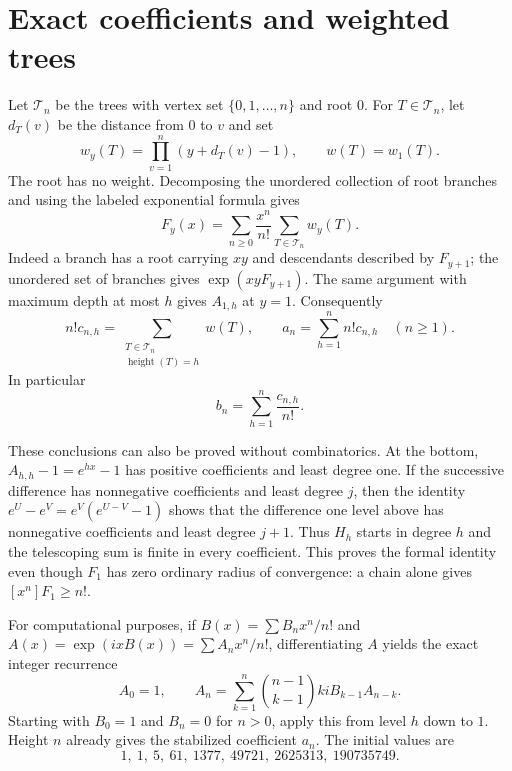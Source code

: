 \documentclass[11pt]{article}
\theoremstyle{remark}\newtheorem{remark}[theorem]{Remark}
\begin{document}
\section{Exact coefficients and weighted trees}\label{xtw:airy:sec:exact}
Let $\mathcal T_n$ be the trees with vertex set $\{0,1,\ldots,n\}$ and root $0$.
For $T\in\mathcal T_n$, let $d_T(v)$ be the distance from $0$ to $v$ and set
\begin{equation}\label{xtw:airy:eq:treeweight}
 w_y(T)=\prod_{v=1}^n(y+d_T(v)-1),\qquad w(T)=w_1(T).
\end{equation}
The root has no weight. Decomposing the unordered collection of root branches
and using the labeled exponential formula gives
\begin{equation}\label{xtw:airy:eq:treeidentity}
 F_y(x)=\sum_{n\ge0}\frac{x^n}{n!}\sum_{T\in\mathcal T_n}w_y(T).
\end{equation}
Indeed a branch has a root carrying $xy$ and descendants described by
$F_{y+1}$; the unordered set of branches gives $\exp(xyF_{y+1})$.
The same argument with maximum depth at most $h$ gives $A_{1,h}$ at $y=1$.
Consequently
\begin{equation}\label{xtw:airy:eq:heightidentity}
 n!c_{n,h}=\sum_{\substack{T\in\mathcal T_n\\\operatorname{height}(T)=h}}w(T),
 \qquad a_n=\sum_{h=1}^n n!c_{n,h}\quad(n\ge1).
\end{equation}
In particular
\begin{equation}\label{xtw:airy:eq:bdecomp}
 b_n=\sum_{h=1}^n\frac{c_{n,h}}{n!}.
\end{equation}

These conclusions can also be proved without combinatorics. At the bottom,
$A_{h,h}-1=e^{hx}-1$ has positive coefficients and least degree one. If the
successive difference has nonnegative coefficients and least degree $j$,
then the identity
$e^U-e^V=e^V(e^{U-V}-1)$ shows that the difference one level above has
nonnegative coefficients and least degree $j+1$. Thus $H_h$ starts in degree
$h$ and the telescoping sum is finite in every coefficient. This proves the
formal identity even though $F_1$ has zero ordinary radius of convergence:
a chain alone gives $[x^n]F_1\ge n!$.

For computational purposes, if
$B(x)=\sum B_nx^n/n!$ and $A(x)=\exp(ixB(x))=\sum A_nx^n/n!$, differentiating
$A$ yields the exact integer recurrence
\begin{equation}\label{xtw:airy:eq:coefficientrec}
 A_0=1,\qquad
 A_n=\sum_{k=1}^n\binom{n-1}{k-1}kiB_{k-1}A_{n-k}.
\end{equation}
Starting with $B_0=1$ and $B_n=0$ for $n>0$, apply this from level $h$ down
to $1$. Height $n$ already gives the stabilized coefficient $a_n$.
The initial values are
\[
 1,\ 1,\ 5,\ 61,\ 1377,\ 49721,\ 2625313,\ 190735749.
\]
\end{document}
